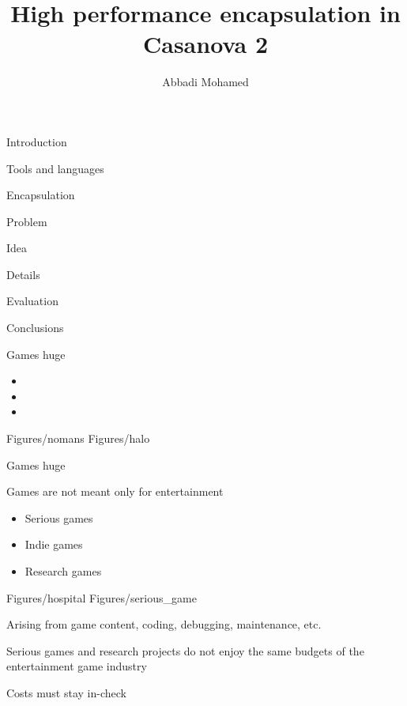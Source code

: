 \documentclass{beamer}
\title{High performance encapsulation in Casanova 2}
\author{Abbadi Mohamed}
\institute{Ca' Foscari University (Venice, Italy)\\
Tilburg University (Tilburg, Netherlands)}
\date{}
\begin{document}
\maketitle

\begin{slide}{
\item Introduction
\item Tools and languages
\item Encapsulation
\item Problem
\item Idea
\item Details
\item Evaluation
\item Conclusions
}\end{slide}


\begin{twoPicturesTextSlide}
{
\item Games huge
\item[]
\item[]
\begin{itemize}
\item[]
\item[]
\item[]
\end{itemize}
}
{Figures/nomans}
{Figures/halo}
\end{twoPicturesTextSlide}



\begin{twoPicturesTextSlide}
{
\item Games huge
\item Games are not meant only for entertainment
\item[]
\begin{itemize}
\item Serious games
\item Indie games
\item Research games
\end{itemize}
}
{Figures/hospital}
{Figures/serious_game}
\end{twoPicturesTextSlide}



\begin{slide}{
\item Arising from game content, coding, debugging, maintenance, etc.
\item Serious games and research projects do not enjoy the same budgets of the entertainment game industry
\item Costs must stay in-check
}\end{slide}
\end{document}
